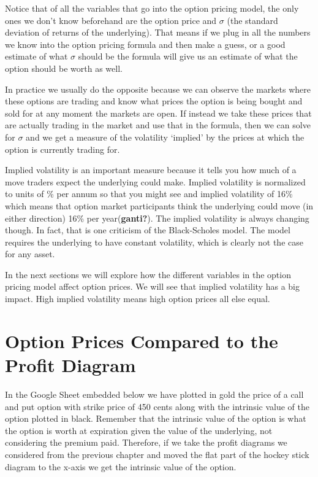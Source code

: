 \documentclass[
  letterpaper,
  DIV=11,
  numbers=noendperiod]{scrreprt}
\begin{document}
Notice that of all the variables that go into the option pricing model,
the only ones we don't know beforehand are the option price and
\(\sigma\) (the standard deviation of returns of the underlying). That
means if we plug in all the numbers we know into the option pricing
formula and then make a guess, or a good estimate of what \(\sigma\)
should be the formula will give us an estimate of what the option should
be worth as well.

In practice we usually do the opposite because we can observe the
markets where these options are trading and know what prices the option
is being bought and sold for at any moment the markets are open. If
instead we take these prices that are actually trading in the market and
use that in the formula, then we can solve for \(\sigma\) and we get a
measure of the volatility `implied' by the prices at which the option is
currently trading for.

Implied volatility is an important measure because it tells you how much
of a move traders expect the underlying could make. Implied volatility
is normalized to units of \% per annum so that you might see and implied
volatility of 16\% which means that option market participants think the
underlying could move (in either direction) 16\% per
year(\textbf{ganti?}). The implied volatility is always changing though.
In fact, that is one criticism of the Black-Scholes model. The model
requires the underlying to have constant volatility, which is clearly
not the case for any asset.

In the next sections we will explore how the different variables in the
option pricing model affect option prices. We will see that implied
volatility has a big impact. High implied volatility means high option
prices all else equal.

\hypertarget{option-prices-compared-to-the-profit-diagram}{%
\section{Option Prices Compared to the Profit
Diagram}\label{option-prices-compared-to-the-profit-diagram}}

In the Google Sheet embedded below we have plotted in gold the price of
a call and put option with strike price of 450 cents along with the
intrinsic value of the option plotted in black. Remember that the
intrinsic value of the option is what the option is worth at expiration
given the value of the underlying, not considering the premium paid.
Therefore, if we take the profit diagrams we considered from the
previous chapter and moved the flat part of the hockey stick diagram to
the x-axis we get the intrinsic value of the option.
\end{document}
